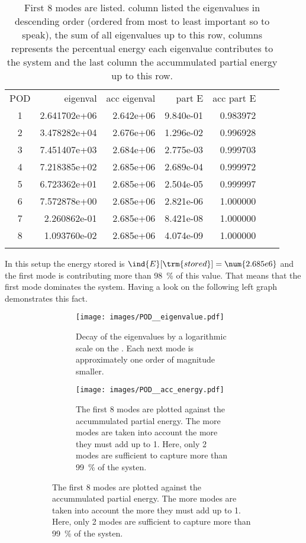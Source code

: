 \documentclass{scrartcl}
\begin{document}
	\begin{longtable}[c]{crrrrrr}
		\toprule
		POD & eigenval & acc eigenval & part E   & acc part E \\
		\cmidrule(lr){1-1} \cmidrule(lr){2-2} \cmidrule(lr){3-3} \cmidrule(lr){4-4} \cmidrule(lr){5-5} 
		1  & 2.641702e+06 & 2.642e+06 & 9.840e-01 & 0.983972 \\
		2  & 3.478282e+04 & 2.676e+06 & 1.296e-02 & 0.996928 \\
		3  & 7.451407e+03 & 2.684e+06 & 2.775e-03 & 0.999703 \\
		4  & 7.218385e+02 & 2.685e+06 & 2.689e-04 & 0.999972 \\
		5  & 6.723362e+01 & 2.685e+06 & 2.504e-05 & 0.999997 \\
		6  & 7.572878e+00 & 2.685e+06 & 2.821e-06 & 1.000000 \\
		7  & 2.260862e-01 & 2.685e+06 & 8.421e-08 & 1.000000 \\
		8  & 1.093760e-02 & 2.685e+06 & 4.074e-09 & 1.000000 \\
		\bottomrule
		\caption{First 8 modes are listed. \tit{eigenval} column listed the eigenvalues in descending order (ordered from most to least important so to speak), \tit{acc eigenval} the sum of all eigenvalues up to this row, \tit{part E} columns represents the percentual energy each eigenvalue contributes to the system and the last column \tit{acc part E} the accummulated partial energy up to this row.}
	\end{longtable}
	In this setup the energy stored is $\ind{E}[\trm{stored}]=\num{2.685e6}$ and the first mode is contributing more than \SI{98}{\percent} of this value. That means that the first mode dominates the system. Having a look on the following left graph demonstrates this fact.
	\begin{figure}[H]
		\begin{figure}[H]
			\begin{minipage}[t]{0.5\linewidth}
				\begin{subfigure}[t]{\linewidth}
					\texttt{[image: images/POD\_\_eigenvalue.pdf]}
					\caption{Decay of the eigenvalues by a logarithmic scale on the . Each next mode is approximately one order of magnitude smaller.}
				\end{subfigure}
			\end{minipage}
			\begin{minipage}[t]{0.5\linewidth}
				\begin{subfigure}[t]{\linewidth}
					\texttt{[image: images/POD\_\_acc\_energy.pdf]}
					\caption{The first 8 modes are plotted against the accummulated partial energy. The more modes are taken into account the more they must add up to 1. Here, only 2 modes are sufficient to capture more than \SI{99}{\percent} of the systen.}
				\end{subfigure}
			\end{minipage}
		\end{figure}
		\caption{}
		\label{}
	\end{figure}
\end{document}
